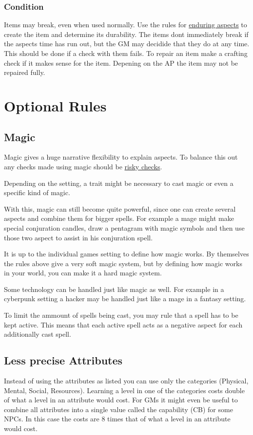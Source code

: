 \documentclass[11pt]{article}
\begin{document}
{\subsubsection{Condition}
\label{sec:org61947a8}
Items may break, even when used normally. Use the rules for \hyperref[sec:org113a79a]{enduring aspects} to create the item and determine its durability. The items dont immediately break if the aspects time has run out, but the GM may decidide that they do at any time. This should be done if a check with them fails. To repair an item make a crafting check if it makes sense for the item. Depening on the AP the item may not be repaired fully.
\section{Optional Rules}
\label{sec:orgd25a3c1}
\subsection{Magic}
\label{sec:orgb341607}

Magic gives a huge narrative flexibility to explain aspects. To balance this out any checks made using magic should be \hyperref[sec:org39f9888]{risky checks}.

Depending on the setting, a trait might be necessary to cast magic or even a specific kind of magic.

With this, magic can still become quite powerful, since one can create several aspects and combine them for bigger spells. For example a mage might make special conjuration candles, draw a pentagram with magic symbols and then use those two aspect to assist in his conjuration spell.

It is up to the individual games setting to define how magic works. By themselves the rules above give a very soft magic system, but by defining how magic works in your world, you can make it a hard magic system.

Some technology can be handled just like magic as well. For example in a cyberpunk setting a hacker may be handled just like a mage in a fantasy setting.

To limit the ammount of spells being cast, you may rule that a spell has to be kept active. This means that each active spell acts as a negative aspect for each additionally cast spell. 
\subsection{Less precise Attributes}
\label{sec:orgb44716c}
Instead of using the attributes as listed you can use only the categories (Physical, Mental, Social, Resources). Learning a level in one of the categories costs double of what a level in an attribute would cost.
For GMs it might even be useful to combine all attributes into a single value called the capability (CB) for some NPCs. In this case the costs are 8 times that of what a level in an attribute would cost.
}
\end{document}
